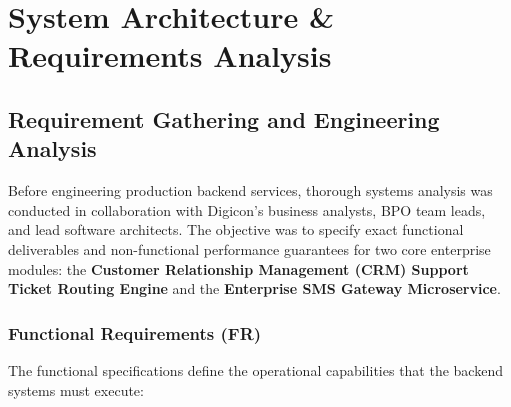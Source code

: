 \chapter{System Architecture \& Requirements Analysis}
\label{ch:system_architecture}

\section{Requirement Gathering and Engineering Analysis}
\label{sec:arch_requirements}

Before engineering production backend services, thorough systems analysis was conducted in collaboration with Digicon's business analysts, BPO team leads, and lead software architects. The objective was to specify exact functional deliverables and non-functional performance guarantees for two core enterprise modules: the \textbf{Customer Relationship Management (CRM) Support Ticket Routing Engine} and the \textbf{Enterprise SMS Gateway Microservice}.

\subsection{Functional Requirements (FR)}
The functional specifications define the operational capabilities that the backend systems must execute:

